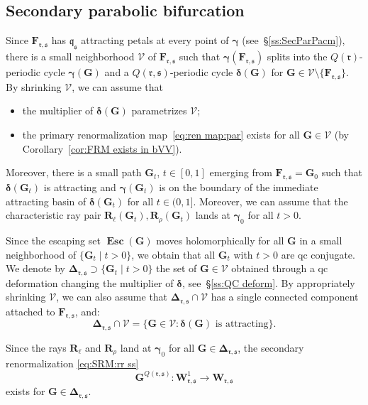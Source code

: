 \documentclass{amsart}
\newcommand{\1}{{\mathbb 1 }}
\newcommand\HH{\boldsymbol{\Delta}}%
\newcommand{\bF}{{\mathbf F}}
\newcommand{\bW}{{\mathbf W}}
\newcommand{\bR}{{\mathbf R}}
\newcommand{\bG}{{\mathbf G}}
\renewcommand{\qq}{\mathfrak{q}}
\newcommand{\rr}{\mathfrak{r}}
\renewcommand{\ss}{\mathfrak{s}}
\newcommand\bVV{{ \boldsymbol{\mathcal V}}}
\theoremstyle{remark}
\numberwithin{equation}{section}
\theoremstyle{definition}
\newcommand{\Esc}{{\boldsymbol{\operatorname{Esc}}}}
\newcommand{\bgamma}{{\boldsymbol{ \gamma}}}
\newcommand{\bdelta}{{\boldsymbol{ \delta}}}
\theoremstyle{nonumberbreak}
\begin{document}
\subsection{Secondary parabolic bifurcation}
Since $\bF_{\rr,\ss}$ has $\qq_\ss$ attracting petals at every point of $\bgamma$ (see~\S\ref{ss:SecParPacm}), there is a small neighborhood $\bVV$ of $\bF_{\rr,\ss}$ such that $\bgamma(\bF_{\rr,\ss})$ splits into the $Q(\rr)$-periodic cycle $\bgamma(\bG)$ and a $Q(\rr,\ss)$-periodic cycle  $\bdelta(\bG)$ for $\bG\in \bVV\setminus \{\bF_{\rr,\ss}\}$. By shrinking $\bVV$,  we can assume that 
\begin{itemize}
\item the multiplier of $\bdelta(\bG)$ parametrizes $\bVV$;
\item the primary renormalization map~\eqref{eq:ren map:par} exists for all $\bG\in \bVV$ (by Corollary~\ref{cor:FRM exists in bVV}).
\end{itemize}


Moreover, there is a small path $\bG_t$, $t\in [0,1]$ emerging from $\bF_{\rr,\ss}=\bG_0$ such that $\bdelta(\bG_t)$ is attracting and $\bgamma(\bG_t)$ is on the boundary of the immediate attracting basin of $\bdelta(\bG_t)$ for all $t\in (0,1]$. Moreover, we can assume that the characteristic ray pair $\bR_\ell(\bG_t), \bR_\rho(\bG_t)$ lands at $\bgamma_0$ for all $t>0.$ 



Since the escaping set $\Esc(\bG)$ moves holomorphically for all $\bG $ in a small neighborhood of $\{\bG_t\mid t>0\}$, we obtain that all $\bG_t$ with $t>0$ are qc conjugate. We denote by $\HH_{\rr,\ss}\supset \{\bG_t\mid t>0\}$ the set of $\bG\in \bVV$ obtained through a qc deformation changing the multiplier of $\bdelta$, see~\S\ref{ss:QC deform}. By appropriately shrinking $\bVV$, we can also assume that  $\HH_{\rr,\ss}\cap \bVV$ has a single connected component attached to $\bF_{\rr,\ss}$, and: 
\begin{equation}
\label{eq:delta is attr}
\HH_{\rr,\ss}\cap  \bVV=\{\bG\in \bVV: \bdelta(\bG)\text{ is attracting}\}.
\end{equation}

Since the rays $\bR_\ell$ and $\bR_\rho$ land at $\bgamma_0$ for all $\bG\in \HH_{\rr,\ss}$, the secondary renormalization \eqref{eq:SRM:rr ss}
\begin{equation}
\label{eq:SRM}
\bG^{Q(\rr,\ss)}\colon \bW_{\rr,\ss}^1 \to \bW_{\rr,\ss}
\end{equation}
exists for $\bG\in \HH_{\rr,\ss}$.
\end{document}

